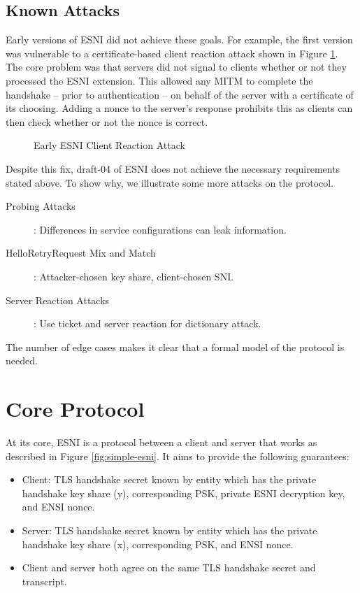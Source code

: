 \documentclass[twoside]{article}
\theoremstyle{definition}
\begin{document}
\subsection{Known Attacks} \label{sec:known-attacks}

Early versions of ESNI did not achieve these goals. For example, the first version was vulnerable to a certificate-based 
client reaction attack shown in Figure \ref{fig:attack1-client-reaction}. The core problem was that servers did not signal
to clients whether or not they processed the ESNI extension. This allowed any MITM to complete the handshake
-- prior to authentication -- on behalf of the server with a certificate of its choosing. Adding a nonce to the server's
response prohibits this as clients can then check whether or not the nonce is correct.

\begin{figure}
    \centering
    \caption{Early ESNI Client Reaction Attack}
    \label{fig:attack1-client-reaction}
\end{figure}

Despite this fix, draft-04 of ESNI does not achieve the necessary requirements stated above. To show why, we 
illustrate some more attacks on the protocol.

\begin{description}
  \item[Probing Attacks]: Differences in service configurations can leak information.
  \item[HelloRetryRequest Mix and Match]: Attacker-chosen key share, client-chosen SNI.
  \item[Server Reaction Attacks]: Use ticket and server reaction for dictionary attack.
\end{description}

The number of edge cases makes it clear that a formal model of the protocol is needed.

\section{Core Protocol} %

At its core, ESNI is a protocol between a client and server that works as described in
Figure \ref{fig:simple-esni}. It aims to provide the following guarantees:
%
\begin{itemize}
  \item Client: TLS handshake secret known by entity which has the private handshake key share (y), corresponding PSK,
  private ESNI decryption key, and ENSI nonce. 
  \item Server: TLS handshake secret known by entity which has the private handshake key share (x), corresponding PSK,
  and ENSI nonce.
  \item Client and server both agree on the same TLS handshake secret and transcript.
\end{itemize}
%
\end{document}
